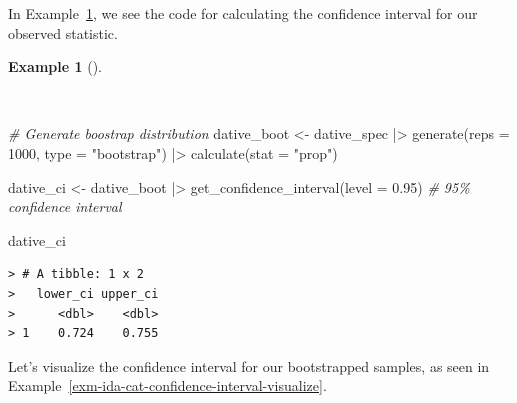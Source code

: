 \documentclass[
  letterpaper,
]{latex/krantz}
\newenvironment{Shaded}{\begin{snugshade}}{\end{snugshade}}
\newcommand{\AttributeTok}[1]{\textcolor[rgb]{0.00,0.00,0.00}{#1}}
\newcommand{\CommentTok}[1]{\textcolor[rgb]{0.00,0.00,0.00}{\textit{#1}}}
\newcommand{\DecValTok}[1]{\textcolor[rgb]{0.00,0.00,0.00}{#1}}
\newcommand{\FloatTok}[1]{\textcolor[rgb]{0.00,0.00,0.00}{#1}}
\newcommand{\FunctionTok}[1]{\textcolor[rgb]{0.00,0.00,0.00}{#1}}
\newcommand{\NormalTok}[1]{\textcolor[rgb]{0.00,0.00,0.00}{#1}}
\newcommand{\OtherTok}[1]{\textcolor[rgb]{0.00,0.00,0.00}{#1}}
\newcommand{\SpecialCharTok}[1]{\textcolor[rgb]{0.00,0.00,0.00}{#1}}
\newcommand{\StringTok}[1]{\textcolor[rgb]{0.00,0.00,0.00}{#1}}
\theoremstyle{definition}
\newtheorem{example}{Example}[chapter]
\theoremstyle{remark}
\begin{document}
In Example~\ref{exm-ida-cat-confidence-interval}, we see the code for
calculating the confidence interval for our observed statistic.

\begin{example}[]\protect\hypertarget{exm-ida-cat-confidence-interval}{}\label{exm-ida-cat-confidence-interval}

~

\begin{Shaded}
\begin{Highlighting}[]
\CommentTok{\# Generate boostrap distribution}
\NormalTok{dative\_boot }\OtherTok{\textless{}{-}}
\NormalTok{  dative\_spec }\SpecialCharTok{|\textgreater{}}
  \FunctionTok{generate}\NormalTok{(}\AttributeTok{reps =} \DecValTok{1000}\NormalTok{, }\AttributeTok{type =} \StringTok{"bootstrap"}\NormalTok{) }\SpecialCharTok{|\textgreater{}}
  \FunctionTok{calculate}\NormalTok{(}\AttributeTok{stat =} \StringTok{"prop"}\NormalTok{)}

\NormalTok{dative\_ci }\OtherTok{\textless{}{-}}
\NormalTok{  dative\_boot }\SpecialCharTok{|\textgreater{}}
  \FunctionTok{get\_confidence\_interval}\NormalTok{(}\AttributeTok{level =} \FloatTok{0.95}\NormalTok{) }\CommentTok{\# 95\% confidence interval}

\NormalTok{dative\_ci}
\end{Highlighting}
\end{Shaded}

\begin{verbatim}
> # A tibble: 1 x 2
>   lower_ci upper_ci
>      <dbl>    <dbl>
> 1    0.724    0.755
\end{verbatim}

\end{example}

Let's visualize the confidence interval for our bootstrapped samples, as
seen in Example~\ref{exm-ida-cat-confidence-interval-visualize}.
\end{document}
